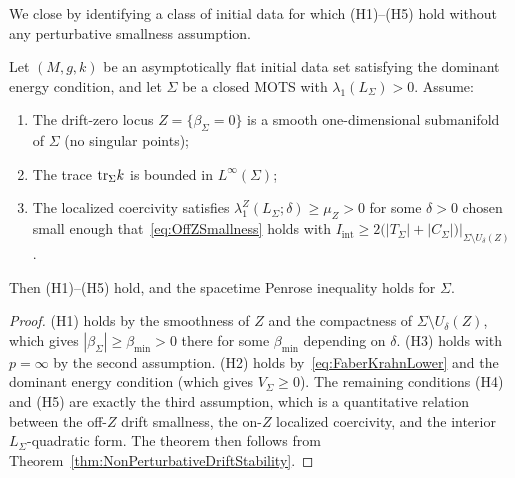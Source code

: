 We close by identifying a class of initial data for which (H1)--(H5) hold without any perturbative smallness assumption.

\begin{theorem}\label{thm:SufficientGeometric}
Let $(M,g,k)$ be an asymptotically flat initial data set satisfying the dominant energy condition, and let $\Sigma$ be a closed MOTS with $\lambda_1(L_\Sigma)>0$. Assume:
\begin{enumerate}
    \item The drift-zero locus $Z=\{\beta_\Sigma=0\}$ is a smooth one-dimensional submanifold of $\Sigma$ (no singular points);
    \item The trace $\mathrm{tr}_\Sigma k$ is bounded in $L^\infty(\Sigma)$;
    \item The localized coercivity satisfies $\lambda_1^Z(L_\Sigma;\delta)\ge\mu_Z>0$ for some $\delta>0$ chosen small enough that~\eqref{eq:OffZSmallness} holds with $I_{\mathrm{int}}\ge2\bigl(|T_\Sigma|+|C_\Sigma|\bigr)|_{\Sigma\setminus U_\delta(Z)}$.
\end{enumerate}
Then (H1)--(H5) hold, and the spacetime Penrose inequality holds for $\Sigma$.
\end{theorem}

\begin{proof}
(H1) holds by the smoothness of $Z$ and the compactness of $\Sigma\setminus U_\delta(Z)$, which gives $|\beta_\Sigma|\ge\beta_{\min}>0$ there for some $\beta_{\min}$ depending on $\delta$. (H3) holds with $p=\infty$ by the second assumption. (H2) holds by~\eqref{eq:FaberKrahnLower} and the dominant energy condition (which gives $V_\Sigma\ge0$). The remaining conditions (H4) and (H5) are exactly the third assumption, which is a quantitative relation between the off-$Z$ drift smallness, the on-$Z$ localized coercivity, and the interior $L_\Sigma$-quadratic form. The theorem then follows from Theorem~\ref{thm:NonPerturbativeDriftStability}.
\end{proof}

